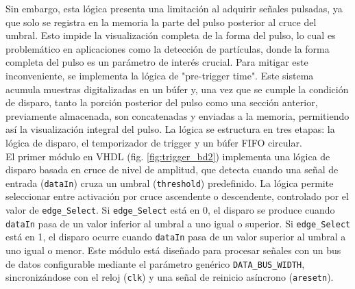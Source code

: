 \documentclass{report}
\begin{document}

\noindent Sin embargo, esta lógica presenta una limitación al adquirir señales pulsadas, ya que solo se registra en la memoria la parte del pulso posterior al cruce del umbral. Esto impide la visualización completa de la forma del pulso, lo cual es problemático en aplicaciones como la detección de partículas, donde la forma completa del pulso es un parámetro de interés crucial. Para mitigar este inconveniente, se implementa la lógica de "pre-trigger time". Este sistema acumula muestras digitalizadas en un búfer y, una vez que se cumple la condición de disparo, tanto la porción posterior del pulso como una sección anterior, previamente almacenada, son concatenadas y enviadas a la memoria, permitiendo así la visualización integral del pulso. La lógica se estructura en tres etapas: la lógica de disparo, el temporizador de trigger y un búfer FIFO circular.\\


\noindent El primer módulo en VHDL (fig. \ref{fig:trigger_bd2}) implementa una lógica de disparo basada en cruce de nivel de amplitud, que detecta cuando una señal de entrada (\texttt{dataIn}) cruza un umbral (\texttt{threshold}) predefinido. La lógica permite seleccionar entre activación por cruce ascendente o descendente, controlado por el valor de \texttt{edge\_Select}. Si \texttt{edge\_Select} está en 0, el disparo se produce cuando \texttt{dataIn} pasa de un valor inferior al umbral a uno igual o superior. Si \texttt{edge\_Select} está en 1, el disparo ocurre cuando \texttt{dataIn} pasa de un valor superior al umbral a uno igual o menor. Este módulo está diseñado para procesar señales con un bus de datos configurable mediante el parámetro genérico \texttt{DATA\_BUS\_WIDTH}, sincronizándose con el reloj (\texttt{clk}) y una señal de reinicio asíncrono (\texttt{aresetn}).
\end{document}
